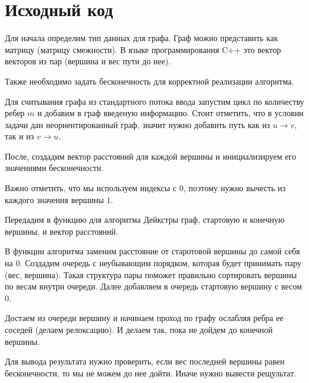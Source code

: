 \section{Исходный код}

Для начала определим тип данных для графа. Граф можно представить как матрицу (матрицу смежности). 
В языке программирования C++ это вектор векторов из пар (вершина и вес пути до нее).

Также необходимо задать бесконечность для корректной реализации алгоритма.

Для считывания графа из стандартного потока ввода запустим цикл по количеству ребер $m$ и добавим в граф
введеную информацию. Стоит отметить, что в условии задачи дан неориентированный граф, значит нужно добавить 
путь как из $u \to v$, так и из $v \to u$.

После, создадим вектор расстояний для каждой вершины и инициализируем его значениями бесконечности.

Важно отметить, что мы используем индексы с $0$, поэтому нужно вычесть из каждого значения вершины $1$.

Передадим в функцию для алгоритма Дейкстры граф, стартовую и конечную вершины, и вектор расстояний.

В функции алгоритма заменим расстояние от старотовой вершины до самой себя на $0$. Создадим очередь с 
неубывающим порядком, которая будет принимать пару (вес, вершина). Такая структура пары поможет 
правильно сортировать вершины по весам внутри очереди. Далее добавляем в очередь стартовую вершину с весом $0$.

Достаем из очереди вершину и начинаем проход по графу ослабляя ребра ее соседей (делаем релоксацию). И делаем
так, пока не дойдем до конечной вершины.

Для вывода результата нужно проверить, если вес последней вершины равен бесконечности, то мы не можем до нее дойти.
Иначе нужно вывести рещультат.


